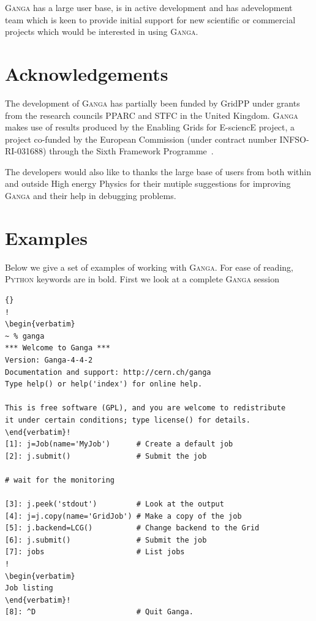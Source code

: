 \documentclass{elsart}
\def\ganga {\textsc{Ganga}\xspace}
\def\python {\textsc{Python}\xspace}
\begin{document}
\ganga has a large user base, is in active development and has adevelopment
team which is keen to provide initial support for new scientific or commercial
projects which would be interested in using \ganga.

\section{Acknowledgements}
\label{sec:acknowledgements}
The development of \ganga has partially been funded by GridPP under grants
from the research councils PPARC and STFC in the United Kingdom. \ganga makes
use of results produced by the Enabling Grids for E-sciencE project, a project
co-funded by the European Commission (under contract number INFSO-RI-031688)
through the Sixth Framework Programme~\cite{EGEE}.

The developers would also like to thanks the large base of users from both
within and outside High energy Physics for their mutiple suggestions for
improving \ganga and their help in debugging problems.


\appendix

\section{Examples}
\label{sec:examples}
Below we give a set of examples of working with \ganga. For ease of reading,
\python keywords are in bold. First we look at a complete \ganga session
\vspace{-2ex}

\tiny
\lstset{language=Python} \lstset{commentstyle=\textit}
\lstset{backgroundcolor=,rulecolor=}
\begin{lstlisting}[escapechar=!]{}
!
\begin{verbatim}
~ % ganga
*** Welcome to Ganga ***
Version: Ganga-4-4-2
Documentation and support: http://cern.ch/ganga
Type help() or help('index') for online help.

This is free software (GPL), and you are welcome to redistribute
it under certain conditions; type license() for details.
\end{verbatim}!
[1]: j=Job(name='MyJob')      # Create a default job
[2]: j.submit()               # Submit the job

# wait for the monitoring

[3]: j.peek('stdout')         # Look at the output
[4]: j=j.copy(name='GridJob') # Make a copy of the job
[5]: j.backend=LCG()          # Change backend to the Grid
[6]: j.submit()               # Submit the job
[7]: jobs                     # List jobs
!
\begin{verbatim}
Job listing
\end{verbatim}!
[8]: ^D                       # Quit Ganga.
\end{lstlisting}
\normalsize
\end{document}
